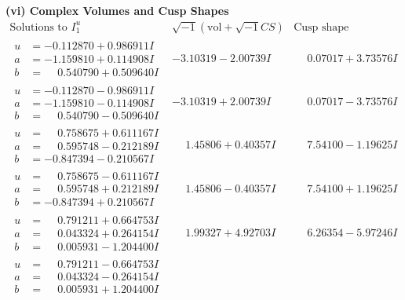 \documentclass[1p]{elsarticle_modified}
\theoremstyle{definition}
\newcommand{\I}{\sqrt{-1}}
\begin{document}
\newpage\flushleft \textbf{(vi) Complex Volumes and Cusp Shapes}
$$\begin{array}{c|c|c}  
\text{Solutions to }I^u_{1}& \I (\text{vol} + \sqrt{-1}CS) & \text{Cusp shape}\\
 \hline 
\begin{aligned}
u &= -0.112870 + 0.986911 I \\
a &= -1.159810 + 0.114908 I \\
b &= \phantom{-}0.540790 + 0.509640 I\end{aligned}
 & -3.10319 - 2.00739 I & \phantom{-}0.07017 + 3.73576 I \\ \hline\begin{aligned}
u &= -0.112870 - 0.986911 I \\
a &= -1.159810 - 0.114908 I \\
b &= \phantom{-}0.540790 - 0.509640 I\end{aligned}
 & -3.10319 + 2.00739 I & \phantom{-}0.07017 - 3.73576 I \\ \hline\begin{aligned}
u &= \phantom{-}0.758675 + 0.611167 I \\
a &= \phantom{-}0.595748 - 0.212189 I \\
b &= -0.847394 - 0.210567 I\end{aligned}
 & \phantom{-}1.45806 + 0.40357 I & \phantom{-}7.54100 - 1.19625 I \\ \hline\begin{aligned}
u &= \phantom{-}0.758675 - 0.611167 I \\
a &= \phantom{-}0.595748 + 0.212189 I \\
b &= -0.847394 + 0.210567 I\end{aligned}
 & \phantom{-}1.45806 - 0.40357 I & \phantom{-}7.54100 + 1.19625 I \\ \hline\begin{aligned}
u &= \phantom{-}0.791211 + 0.664753 I \\
a &= \phantom{-}0.043324 + 0.264154 I \\
b &= \phantom{-}0.005931 - 1.204400 I\end{aligned}
 & \phantom{-}1.99327 + 4.92703 I & \phantom{-}6.26354 - 5.97246 I \\ \hline\begin{aligned}
u &= \phantom{-}0.791211 - 0.664753 I \\
a &= \phantom{-}0.043324 - 0.264154 I \\
b &= \phantom{-}0.005931 + 1.204400 I\end{aligned}

\end{array}$$
\end{document}
